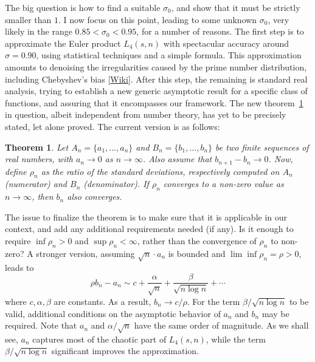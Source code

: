 \documentclass[oneside,10pt]{book}
\newtheorem{theorem}{Theorem}[section]
\begin{document}
The big question is how to find a suitable $\sigma_0$, and show that it must be strictly smaller than $1$. I now focus on 
 this point, leading to some unknown $\sigma_0$, very likely in the range $0.85 <\sigma_0 < 0.95$, for a number of reasons.
 The first step is to approximate the Euler product $L_4(s,n)$ with spectacular accuracy around $\sigma=0.90$,  using statistical techniques and a simple formula. This approximation amounts to denoising the irregularities caused by the prime number distribution,
 including \textcolor{index}{Chebyshev's bias} [\href{https://en.wikipedia.org/wiki/Chebyshev\%27s_bias}{Wiki}]. 
After this step, the remaining is standard real analysis, trying to establish a new generic asymptotic result for a specific class 
 of functions, and assuring that it encompasses our framework. The new theorem~\ref{5rhgf} in question, albeit independent from
 number theory, has yet to be precisely stated, let alone proved.  The current version is as follows:\vspace{1ex}

\begin{theorem}\label{5rhgf}
Let $A_n = \{a_1, \dots, a_n\}$ and $B_n = \{b_1,\dots, b_n\}$ be two finite sequences of real numbers, with $a_n\rightarrow 0$ as $n\rightarrow\infty$. Also assume that
 $b_{n+1}-b_n \rightarrow 0$. Now, define $\rho_n$ as the ratio of the standard deviations, respectively computed on $A_n$  (numerator) and $B_n$ (denominator). If $\rho_n$ converges to a non-zero value as $n\rightarrow\infty$, then 
$b_n$ also converges.
\end{theorem}\vspace{1ex}

\noindent The issue to finalize the theorem is to make sure that it is applicable in our context, and add any additional requirements needed (if any). Is it enough to require $\inf \rho_n > 0$
 and $\sup \rho_n < \infty$, rather than the convergence of $\rho_n$ to non-zero? A stronger version, assuming  $\sqrt{n}\cdot a_n$  
 is bounded and $\lim\inf \rho_n = \rho > 0$, leads to
\begin{equation}
\rho b_n - a_n \sim c + \frac{\alpha}{\sqrt{n}} +\frac{\beta}{\sqrt{n\log n}} +\cdots   \label{yuietgv}
\end{equation}
 where $c, \alpha, \beta$ are constants. As a result,  $b_n \rightarrow c/\rho$. For the term $\beta/\sqrt{n\log n}$ to be valid, additional conditions
  on the asymptotic behavior of $a_n$ and $b_n$ may be required. Note that $a_n$ and $\alpha/\sqrt{n}$ have the same order of magnitude. As we shall see, $a_n$ captures most of the chaotic part of $L_4(s,n)$, while the term 
$\beta/\sqrt{n\log n}$ significant improves the approximation. 
\end{document}

